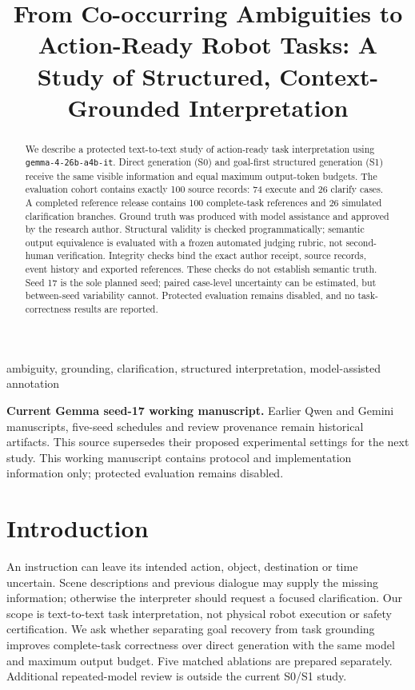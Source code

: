 \documentclass[10pt,conference]{IEEEtran}
\title{From Co-occurring Ambiguities to Action-Ready Robot Tasks: A Study of Structured, Context-Grounded Interpretation}
\author{\IEEEauthorblockN{Mohammed Bangie \hspace{0.5em} (Student No. 2610990)}\IEEEauthorblockA{School of Computer Science and Applied Mathematics\\University of the Witwatersrand, Johannesburg, South Africa\\Supervisors: Steven James and Benjamin Rosman}}
\begin{document}
\maketitle\thispagestyle{plain}\pagestyle{plain}
\begin{abstract}
We describe a protected text-to-text study of action-ready task interpretation using \texttt{gemma-4-26b-a4b-it}. Direct generation (S0) and goal-first structured generation (S1) receive the same visible information and equal maximum output-token budgets. The evaluation cohort contains exactly 100 source records: 74 execute and 26 clarify cases. A completed reference release contains 100 complete-task references and 26 simulated clarification branches. Ground truth was produced with model assistance and approved by the research author. Structural validity is checked programmatically; semantic output equivalence is evaluated with a frozen automated judging rubric, not second-human verification. Integrity checks bind the exact author receipt, source records, event history and exported references. These checks do not establish semantic truth. Seed 17 is the sole planned seed; paired case-level uncertainty can be estimated, but between-seed variability cannot. Protected evaluation remains disabled, and no task-correctness results are reported.
\end{abstract}
\begin{IEEEkeywords}
ambiguity, grounding, clarification, structured interpretation, model-assisted annotation
\end{IEEEkeywords}
\noindent\textbf{Current Gemma seed-17 working manuscript.} Earlier Qwen and Gemini manuscripts, five-seed schedules and review provenance remain historical artifacts. This source supersedes their proposed experimental settings for the next study. This working manuscript contains protocol and implementation information only; protected evaluation remains disabled.

\section{Introduction}
An instruction can leave its intended action, object, destination or time uncertain. Scene descriptions and previous dialogue may supply the missing information; otherwise the interpreter should request a focused clarification. Our scope is text-to-text task interpretation, not physical robot execution or safety certification. We ask whether separating goal recovery from task grounding improves complete-task correctness over direct generation with the same model and maximum output budget. Five matched ablations are prepared separately. Additional repeated-model review is outside the current S0/S1 study.
\end{document}
